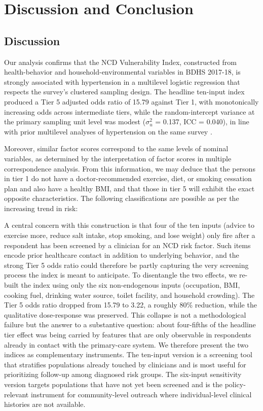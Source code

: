 \documentclass[
  12pt,
  a4paper]{article}
\begin{document}
\section{Discussion and Conclusion}\label{discussion-and-conclusion}

\subsection{Discussion}\label{discussion}

Our analysis confirms that the NCD Vulnerability Index, constructed from health-behavior and household-environmental variables in BDHS 2017-18, is strongly associated with hypertension in a multilevel logistic regression that respects the survey's clustered sampling design. The headline ten-input index produced a Tier 5 adjusted odds ratio of 15.79 against Tier 1, with monotonically increasing odds across intermediate tiers, while the random-intercept variance at the primary sampling unit level was modest (\(\sigma^2_u\) = 0.137, ICC = 0.040), in line with prior multilevel analyses of hypertension on the same survey \citep{ghosh2023prevalence}.

Moreover, similar factor scores correspond to the same levels of nominal variables, as determined by the interpretation of factor scores in multiple correspondence analysis. From this information, we may deduce that the persons in tier 1 do not have a doctor-recommended exercise, diet, or smoking cessation plan and also have a healthy BMI, and that those in tier 5 will exhibit the exact opposite characteristics. The following classifications are possible as per the increasing trend in risk:



A central concern with this construction is that four of the ten inputs (advice to exercise more, reduce salt intake, stop smoking, and lose weight) only fire after a respondent has been screened by a clinician for an NCD risk factor. Such items encode prior healthcare contact in addition to underlying behavior, and the strong Tier 5 odds ratio could therefore be partly capturing the very screening process the index is meant to anticipate. To disentangle the two effects, we re-built the index using only the six non-endogenous inputs (occupation, BMI, cooking fuel, drinking water source, toilet facility, and household crowding). The Tier 5 odds ratio dropped from 15.79 to 3.22, a roughly 80\% reduction, while the qualitative dose-response was preserved. This collapse is not a methodological failure but the answer to a substantive question: about four-fifths of the headline tier effect was being carried by features that are only observable in respondents already in contact with the primary-care system. We therefore present the two indices as complementary instruments. The ten-input version is a screening tool that stratifies populations already touched by clinicians and is most useful for prioritizing follow-up among diagnosed risk groups. The six-input sensitivity version targets populations that have not yet been screened and is the policy-relevant instrument for community-level outreach where individual-level clinical histories are not available.
\end{document}
